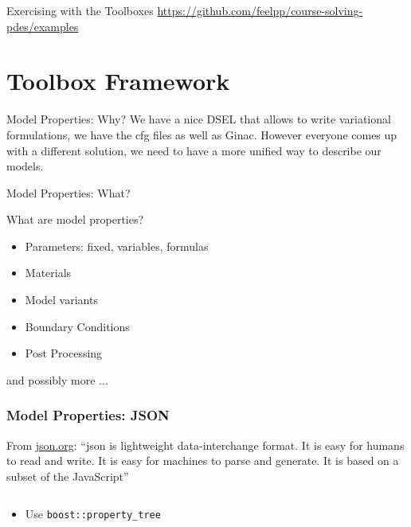 \begin{frame}[standout]{Exercising with the Toolboxes}
  \url{https://github.com/feelpp/course-solving-pdes/examples}
\end{frame}

\section{Toolbox  Framework}

\begin{frame}{Model Properties: Why?}
  We have a nice DSEL that allows to write variational formulations,
  we have the cfg files as well as Ginac. However everyone comes up
  with a different solution, we need to have a more unified way to
  describe our models.

  \centering
  \vfill\vspace{1em}\vfill
\end{frame}

\begin{frame}{Model Properties: What?}

What are model properties?
\begin{itemize}
\item Parameters: fixed, variables, formulas
\item Materials
\item Model variants
\item Boundary Conditions
\item Post Processing
\end{itemize}
and possibly more ...

\end{frame}

\begin{frame}[fragile]
  \frametitle{Model Properties: JSON}
  From \url{json.org}: ``json is lightweight data-interchange format. It
  is easy for humans to read and write. It is easy for machines to
  parse and generate. It is based on a subset of the JavaScript''

  \inputminted{json}{Codes/prudhomme/fud4/turek.feelpp}
  \begin{itemize}
  \item Use \texttt{boost::property_tree}
  \end{itemize}
\end{frame}

